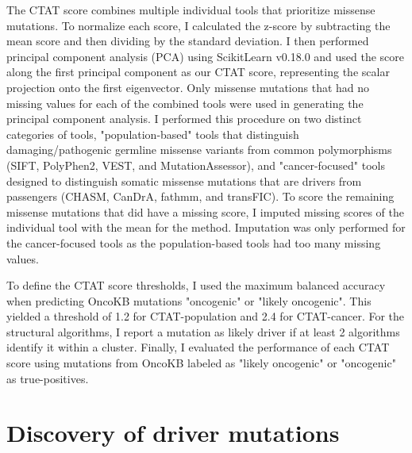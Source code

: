 The CTAT score combines multiple individual tools that prioritize missense mutations. To normalize each score, I calculated the z-score by subtracting the mean score and then dividing by the standard deviation. I then performed principal component analysis (PCA) using ScikitLearn v0.18.0 and used the score along the first principal component as our CTAT score, representing the scalar projection onto the first eigenvector. Only missense mutations that had no missing values for each of the combined tools were used in generating the principal component analysis. I performed this procedure on two distinct categories of tools, "population-based" tools that distinguish damaging/pathogenic germline missense variants from common polymorphisms (SIFT, PolyPhen2, VEST, and MutationAssessor), and "cancer-focused" tools designed to distinguish somatic missense mutations that are drivers from passengers (CHASM, CanDrA, fathmm, and transFIC). To score the remaining missense mutations that did have a missing score, I imputed missing scores of the individual tool with the mean for the method. Imputation was only performed for the cancer-focused tools as the population-based tools had too many missing values.

To define the CTAT score thresholds, I used the maximum balanced accuracy when predicting OncoKB mutations "oncogenic" or "likely oncogenic". This yielded a threshold of 1.2 for CTAT-population and 2.4 for CTAT-cancer. For the structural algorithms, I report a mutation as likely driver if at least 2 algorithms identify it within a cluster. Finally, I evaluated the performance of each CTAT score using mutations from OncoKB labeled as "likely oncogenic" or "oncogenic" as true-positives. 

\section{Discovery of driver mutations}


